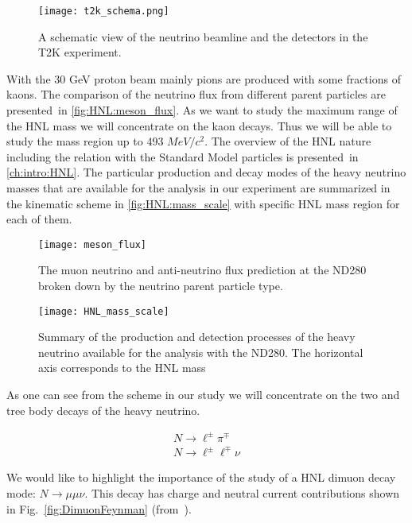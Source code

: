 \documentclass[../main.tex]{subfiles}
\begin{document}
\begin{figure}[!ht]
    \centering
    \texttt{[image: t2k\_schema.png]}
    \caption{A schematic view of the neutrino beamline and the detectors in the T2K experiment.}
    \label{fig:HNL:t2k_schema}
\end{figure}

With the 30 GeV proton beam mainly pions are produced with some fractions of kaons. The comparison of the neutrino flux from different parent particles are presented~in \autoref{fig:HNL:meson_flux}. As we want to study the maximum range of the HNL mass we will concentrate on the kaon decays. Thus we will be able to study the mass region up to 493 $MeV/c^2$. The overview of the HNL nature including the relation with the Standard Model particles is presented~in \autoref{ch:intro:HNL}. The particular production and decay modes of the heavy neutrino masses that are available for the analysis in our experiment are summarized in the kinematic scheme in \autoref{fig:HNL:mass_scale} with specific HNL mass region for each of them.

\begin{figure}[!ht]
    \centering
    \texttt{[image: meson\_flux]}
    \caption{The muon neutrino and anti-neutrino flux prediction at the ND280 broken down by the neutrino parent particle type.}
    \label{fig:HNL:meson_flux}
\end{figure}

\begin{figure}[!ht]
    \centering
    \texttt{[image: HNL\_mass\_scale]}
    \caption{Summary of the production and detection processes of the heavy neutrino available for the analysis with the ND280. The horizontal axis corresponds to the HNL mass}
    \label{fig:HNL:mass_scale}
\end{figure}

As one can see from the scheme in our study we will concentrate on the two and tree body decays of the heavy neutrino.

\begin{eqnarray}
    &N\to\ell^{\pm}\pi^{\mp} &\\
    &N\to\ell^{\pm}\ell^{\mp}\nu
\end{eqnarray}

We would like to highlight the importance of the study of a HNL dimuon decay mode: $N\to\mu\mu\nu$. This decay has charge and neutral current contributions shown in Fig.~\ref{fig:DimuonFeynman} (from~\cite{Johnson1997}).
\end{document}
